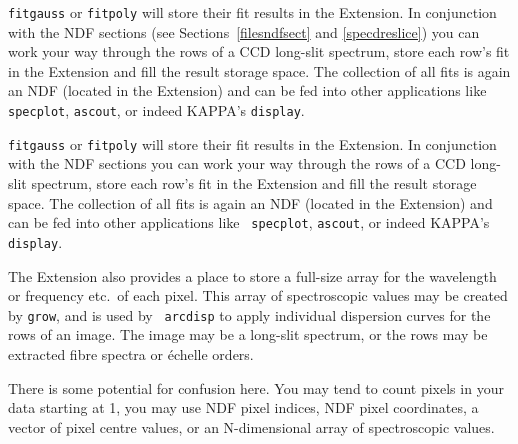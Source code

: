 \documentclass[11pt,twoside]{article}
\newenvironment{latexonly}{}{}
\newcommand{\htmlref}[2]{#1}
\newcommand{\xref}[3]{#1}
\begin{document}
\begin{latexonly}
{\tt\htmlref{fitgauss}{FITGAUSS}}
   or
{\tt\htmlref{fitpoly}{FITPOLY}}
   will store their fit results in the Extension. In conjunction with
   the NDF sections
(see Sections~\ref{filesndfsect} and \ref{specdreslice})
   you can work your way through the rows of a CCD long-slit spectrum,
   store each row's fit in the Extension and fill the result storage
   space. The collection of all fits is again an NDF (located in the
   Extension) and can be fed into other applications like {\tt
   specplot}, {\tt ascout}, or indeed KAPPA's
{\tt\xref{display}{sun95}{DISPLAY}}.
\end{latexonly}
\begin{htmlonly}
{\tt\htmlref{fitgauss}{FITGAUSS}}
   or
{\tt\htmlref{fitpoly}{FITPOLY}}
   will store their fit results in the Extension. In conjunction with
   the
\htmlref{NDF sections}{slice}
   you can work your way through the rows of a CCD long-slit spectrum,
   store each row's fit in the Extension and fill the result storage
   space. The collection of all fits is again an NDF (located in the
   Extension) and can be fed into other applications like {\tt
   specplot}, {\tt ascout}, or indeed KAPPA's
{\tt\xref{display}{sun95}{DISPLAY}}.
\end{htmlonly}

   The Extension also provides a place to store a full-size array for
   the wavelength or frequency etc.\ of each pixel.  This array of
   spectroscopic values may be created by {\tt grow}, and is used by {\tt
   arcdisp} to apply individual dispersion curves for the rows of an image.
   The image may be a long-slit spectrum, or the rows may be extracted
   fibre spectra or \'echelle orders.

   There is some potential for confusion here.  You may tend to count
   pixels in your data starting at 1, you may use NDF pixel indices, NDF
   pixel coordinates, a vector of pixel centre values, or an
   N-dimensional array of spectroscopic values.
\end{document}

